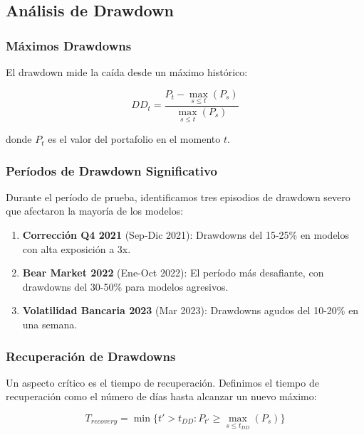 \subsection{An\'alisis de Drawdown}
\label{subsec:drawdown_analysis}

\subsubsection{M\'aximos Drawdowns}

El drawdown mide la ca\'ida desde un m\'aximo hist\'orico:

\begin{equation}
DD_t = \frac{P_t - \max_{s \leq t}(P_s)}{\max_{s \leq t}(P_s)}
\label{eq:drawdown}
\end{equation}

donde $P_t$ es el valor del portafolio en el momento $t$.

\subsubsection{Per\'iodos de Drawdown Significativo}

Durante el per\'iodo de prueba, identificamos tres episodios de drawdown severo que afectaron la mayor\'ia de los modelos:

\begin{enumerate}
    \item \textbf{Correcci\'on Q4 2021} (Sep-Dic 2021): Drawdowns del 15-25\% en modelos con alta exposici\'on a 3x.
    \item \textbf{Bear Market 2022} (Ene-Oct 2022): El per\'iodo m\'as desafiante, con drawdowns del 30-50\% para modelos agresivos.
    \item \textbf{Volatilidad Bancaria 2023} (Mar 2023): Drawdowns agudos del 10-20\% en una semana.
\end{enumerate}

\subsubsection{Recuperaci\'on de Drawdowns}

Un aspecto cr\'itico es el tiempo de recuperaci\'on. Definimos el tiempo de recuperaci\'on como el n\'umero de d\'ias hasta alcanzar un nuevo m\'aximo:

\begin{equation}
T_{recovery} = \min\{t' > t_{DD} : P_{t'} \geq \max_{s \leq t_{DD}}(P_s)\}
\label{eq:recovery}
\end{equation}

